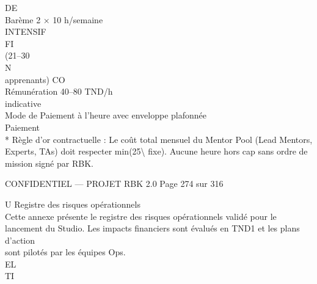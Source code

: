 \documentclass[12pt,landscape,a4paper]{article}
\newenvironment{confidential}
{\begin{tcolorbox}[
    colback=rbkred!5!white,
    colframe=rbkred!75!black,
    title=CONFIDENTIEL,
    fonttitle=\bfseries\color{white},
    coltitle=rbkred!75!black,
    breakable,
    enhanced,
    frame hidden,
    borderline west={2pt}{0pt}{rbkred!75!black}
]}
{\end{tcolorbox}}
\begin{document}
DE\\
Barème           2 × 10 h/semaine\\
INTENSIF\\
\vspace{0.5em}
\vspace{0.5em}
\vspace{0.5em}
\vspace{0.5em}
FI\\
(21–30\\
\vspace{0.5em}
\vspace{0.5em}
\vspace{0.5em}
N\\
apprenants)            CO\\
Rémunération 40–80 TND/h\\
indicative\\
\vspace{0.5em}
Mode de            Paiement à l’heure avec enveloppe plafonnée\\
Paiement\\
* Règle d’or contractuelle : Le coût total mensuel du Mentor Pool (Lead Mentors, Experts, TAs) doit respecter min(25\textbackslash{}%
fixe). Aucune heure hors cap sans ordre de mission signé par RBK.\\
\vspace{0.5em}
\vspace{0.5em}
\vspace{0.5em}
\vspace{0.5em}
\begin{confidential}CONFIDENTIEL — PROJET RBK 2.0                                     Page 274 sur 316\end{confidential}
U \textbar{} Registre des risques opérationnels\\
\vspace{0.5em}
\vspace{0.5em}
Cette annexe présente le registre des risques opérationnels validé pour le lancement du Studio. Les impacts financiers sont évalués en TND1 et les plans d’action\\
sont pilotés par les équipes Ops.\\
\vspace{0.5em}
\vspace{0.5em}
\vspace{0.5em}
\vspace{0.5em}
EL\\
TI\\
\end{document}
